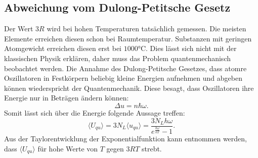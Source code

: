 \subsection{Abweichung vom Dulong-Petitsche Gesetz}
Der Wert $3R$ wird bei hohen Temperaturen tatsächlich gemessen.
Die meisten Elemente erreichen diesen schon bei Raumtemperatur.
Substanzen mit geringen Atomgewicht erreichen diesen erst bei $1000\si{\celsius}$.
Dies lässt sich nicht mit der klassischen Physik erklären, daher muss das Problem quantenmechanisch beobachtet werden.
Die Annahme des Dulong-Petitsche Gesetzes, dass atomre Oszillatoren in Festkörpern beliebig kleine Energien aufnehmen und abgeben können wiederspricht der Quantenmechanik.
Diese besagt, dass Oszillatoren ihre Energie nur in Beträgen ändern können:
\begin{equation}
\Delta u = n \hbar \omega .
\end{equation}
Somit lässt sich über die Energie folgende Aussage treffen:
\begin{equation}
\langle U_{qu} \rangle = 3 N_L \langle u_{qu} \rangle = \frac{3 N_L h \omega}{e^{\frac{h\omega}{kT}}-1} .
\end{equation}
Aus der Taylorentwicklung der Exponentialfunktion kann entnommen werden, dass $\langle U_{qu} \rangle$ für hohe Werte von $T$ gegen $3RT$ strebt.
